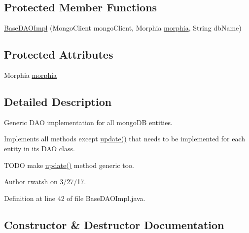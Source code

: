 \subsection*{Protected Member Functions}
\begin{DoxyCompactItemize}
\item 
\hyperlink{classedu_1_1sjsu_1_1amigo_1_1db_1_1common_1_1mongodb_1_1_base_d_a_o_impl_ac3c22183bcb1b8c048b9fc741b189ed3}{Base\+D\+A\+O\+Impl} (Mongo\+Client mongo\+Client, Morphia \hyperlink{classedu_1_1sjsu_1_1amigo_1_1db_1_1common_1_1mongodb_1_1_base_d_a_o_impl_ac405c66365add92a549f7c386248fca4}{morphia}, String db\+Name)
\end{DoxyCompactItemize}
\subsection*{Protected Attributes}
\begin{DoxyCompactItemize}
\item 
Morphia \hyperlink{classedu_1_1sjsu_1_1amigo_1_1db_1_1common_1_1mongodb_1_1_base_d_a_o_impl_ac405c66365add92a549f7c386248fca4}{morphia}
\end{DoxyCompactItemize}


\subsection{Detailed Description}
Generic D\+AO implementation for all mongo\+DB entities.

Implements all methods except \hyperlink{interfaceedu_1_1sjsu_1_1amigo_1_1db_1_1common_1_1_base_d_a_o_a8204c75fed7b773eafba11a6a7d9d689}{update()} that needs to be implemented for each entity in its D\+AO class.

T\+O\+DO make \hyperlink{interfaceedu_1_1sjsu_1_1amigo_1_1db_1_1common_1_1_base_d_a_o_a8204c75fed7b773eafba11a6a7d9d689}{update()} method generic too.

\begin{DoxyAuthor}{Author}
rwatsh on 3/27/17. 
\end{DoxyAuthor}


Definition at line 42 of file Base\+D\+A\+O\+Impl.\+java.



\subsection{Constructor \& Destructor Documentation}
\mbox{\label{classedu_1_1sjsu_1_1amigo_1_1db_1_1common_1_1mongodb_1_1_base_d_a_o_impl_ac3c22183bcb1b8c048b9fc741b189ed3}} 
